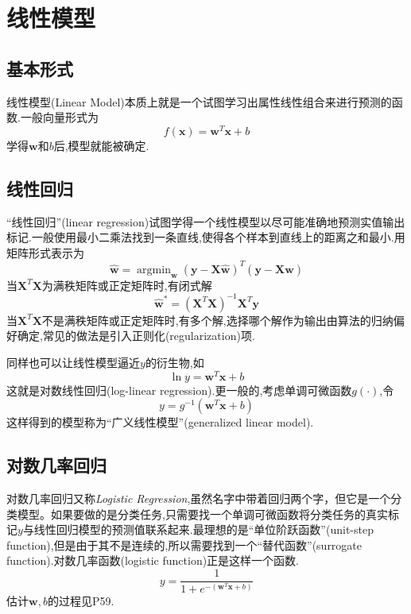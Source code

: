\chapter{线性模型}

\section{基本形式}

线性模型(Linear Model)本质上就是一个试图学习出属性线性组合来进行预测的函数.一般向量形式为
\begin{equation}
    f(\bm x)=\bm{w}^T\bm{x}+b
\end{equation}
学得$\bm w$和$b$后,模型就能被确定.

\section{线性回归}

``线性回归''(linear regression)试图学得一个线性模型以尽可能准确地预测实值输出标记.一般使用最小二乘法找到一条直线,使得各个样本到直线上的距离之和最小.用矩阵形式表示为
\begin{equation}
\hat{\bm w}=\mathop{\arg\min}_{\hat{\bm w}}(\bm y-\bm X\hat{\bm w})^T(\bm y-\bm X\hat{\bm w})
\end{equation}
当$\bm X^T\bm X$为满秩矩阵或正定矩阵时,有闭式解
\begin{equation}
\hat{\bm w}^\ast=(\bm X^T\bm X)^{-1}\bm X^T\bm y
\end{equation}
当$\bm X^T\bm X$不是满秩矩阵或正定矩阵时,有多个解,选择哪个解作为输出由算法的归纳偏好确定,常见的做法是引入正则化(regularization)项.

同样也可以让线性模型逼近$y$的衍生物,如
\begin{equation}
\ln y=\bm w^T\bm x+b
\end{equation}
这就是对数线性回归(log-linear regression).更一般的,考虑单调可微函数$g(\cdot)$,令
\begin{equation}
y=g^{-1}(\bm w^T\bm x+b)
\end{equation}
这样得到的模型称为``广义线性模型''(generalized linear model).

\section{对数几率回归}

对数几率回归又称\textit{Logistic Regression},虽然名字中带着回归两个字，但它是一个分类模型。如果要做的是分类任务,只需要找一个单调可微函数将分类任务的真实标记$y$与线性回归模型的预测值联系起来.最理想的是``单位阶跃函数''(unit-step function),但是由于其不是连续的,所以需要找到一个``替代函数''(surrogate function).对数几率函数(logistic function)正是这样一个函数.
\begin{equation}
y=\frac{1}{1+e^{-(\bm w^T\bm x+b)}}
\end{equation}
估计$\bm w,b$的过程见P59.


